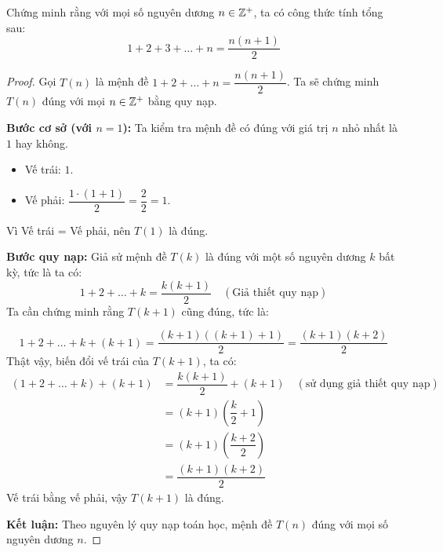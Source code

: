 \begin{example}
    Chứng minh rằng với mọi số nguyên dương $n \in \mathbb{Z}^+$, ta có công thức tính tổng sau:
    \[ 1 + 2 + 3 + \dots + n = \dfrac{n(n+1)}{2} \]
    
    \begin{proof}
    Gọi $T(n)$ là mệnh đề $1 + 2 + \dots + n = \dfrac{n(n+1)}{2}$. Ta sẽ chứng minh $T(n)$ đúng với mọi $n \in \mathbb{Z}^+$ bằng quy nạp.

    \textbf{Bước cơ sở (với $n=1$):}
    Ta kiểm tra mệnh đề có đúng với giá trị $n$ nhỏ nhất là $1$ hay không.
    \begin{itemize}
        \item Vế trái: $1$.
        \item Vế phải: $\dfrac{1 \cdot (1+1)}{2} = \dfrac{2}{2} = 1$.
    \end{itemize}
    Vì Vế trái = Vế phải, nên $T(1)$ là đúng.

    \textbf{Bước quy nạp:}
    Giả sử mệnh đề $T(k)$ là đúng với một số nguyên dương $k$ bất kỳ, tức là ta có:
    \[ 1 + 2 + \dots + k = \dfrac{k(k+1)}{2} \quad (\text{Giả thiết quy nạp}) \]
    Ta cần chứng minh rằng $T(k+1)$ cũng đúng, tức là:
    
    \[ 1 + 2 + \dots + k + (k+1) = \dfrac{(k+1)((k+1)+1)}{2} = \dfrac{(k+1)(k+2)}{2} \]
    Thật vậy, biến đổi vế trái của $T(k+1)$, ta có:
    \begin{align*}
        (1 + 2 + \dots + k) + (k+1) &= \dfrac{k(k+1)}{2} + (k+1) \quad (\text{sử dụng giả thiết quy nạp}) \\
        &= (k+1) \left( \dfrac{k}{2} + 1 \right) \\
        &= (k+1) \left( \dfrac{k+2}{2} \right) \\
        &= \dfrac{(k+1)(k+2)}{2}
    \end{align*}
    Vế trái bằng vế phải, vậy $T(k+1)$ là đúng.

    \textbf{Kết luận:}
    Theo nguyên lý quy nạp toán học, mệnh đề $T(n)$ đúng với mọi số nguyên dương $n$.
    \end{proof}
\end{example}


